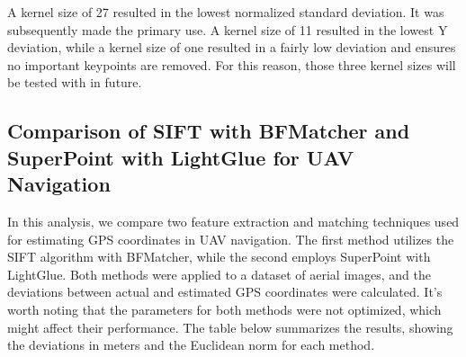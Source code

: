 A kernel size of 27 resulted in the lowest normalized standard deviation. It was subsequently made the primary use. A kernel size of 11 resulted in the lowest Y deviation, while a kernel size of one resulted in a fairly low deviation and ensures no important keypoints are removed. For this reason, those three kernel sizes will be tested with in future.

\subsection*{Comparison of SIFT with BFMatcher and SuperPoint with LightGlue for UAV Navigation}

In this analysis, we compare two feature extraction and matching techniques used for estimating GPS coordinates in UAV navigation. The first method utilizes the SIFT algorithm with BFMatcher, while the second employs SuperPoint with LightGlue. Both methods were applied to a dataset of aerial images, and the deviations between actual and estimated GPS coordinates were calculated. It's worth noting that the parameters for both methods were not optimized, which might affect their performance. The table below summarizes the results, showing the deviations in meters and the Euclidean norm for each method.

